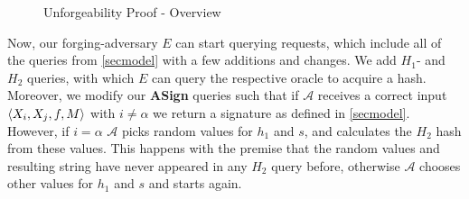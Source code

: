 \begin{figure}[htbp]

  \begin{center}
  \end{center}

  \caption{Unforgeability Proof - Overview}
  \label{fig:proofoverview}
\end{figure}

Now, our forging-adversary \(E\) can start querying requests, which include all of the queries from \autoref{secmodel} with a few additions and changes.
We add \(H_1\)- and \(H_2\) queries, with which \(E\) can query the respective oracle to acquire a hash. 
Moreover, we modify our \textbf{ASign} queries such that if \(\mathcal{A}\) receives a correct input \(\langle X_i, X_j, f, M \rangle\) with \(i\neq\alpha\) we return a signature as defined in \autoref{secmodel}.
However, if \(i = \alpha\) \(\mathcal{A}\) picks random values for \(h_1\) and \(s\), and calculates the \(H_2\) hash from these values.
This happens with the premise that the random values and resulting string have never appeared in any \(H_2\) query before, otherwise \(\mathcal{A}\) chooses other values for \(h_1\) and \(s\) and starts again.

